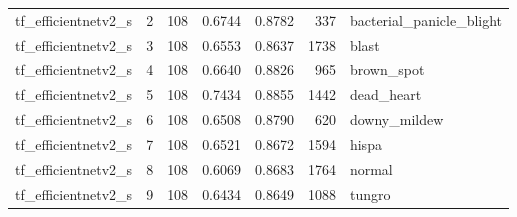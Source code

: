 \begin{tabular}{lrrrrrl}
tf\_efficientnetv2\_s & 2 & 108 & 0.6744 & 0.8782 & 337 & bacterial\_panicle\_blight \\
tf\_efficientnetv2\_s & 3 & 108 & 0.6553 & 0.8637 & 1738 & blast \\
tf\_efficientnetv2\_s & 4 & 108 & 0.6640 & 0.8826 & 965 & brown\_spot \\
tf\_efficientnetv2\_s & 5 & 108 & 0.7434 & 0.8855 & 1442 & dead\_heart \\
tf\_efficientnetv2\_s & 6 & 108 & 0.6508 & 0.8790 & 620 & downy\_mildew \\
tf\_efficientnetv2\_s & 7 & 108 & 0.6521 & 0.8672 & 1594 & hispa \\
tf\_efficientnetv2\_s & 8 & 108 & 0.6069 & 0.8683 & 1764 & normal \\
tf\_efficientnetv2\_s & 9 & 108 & 0.6434 & 0.8649 & 1088 & tungro \\
\bottomrule
\end{tabular}
